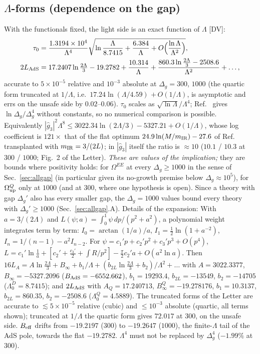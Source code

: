 \documentclass[aps,prl,onecolumn,superscriptaddress,nofootinbib]{revtex4-2}
\begin{document}
\subsection{\texorpdfstring{$\Lambda$}{Lambda}-forms (dependence on the gap)}
\label{sec:lambda}
With the functionals fixed, the light side is an exact function of $\Lambda$ [DV]:
\begin{align}
\tau_0&=\frac{1.3194\times10^4}{\Lambda^4}\sqrt{\ln\frac{\Lambda}{8.7415}+\frac{6.384}{\Lambda}+O\Big(\frac{\ln\Lambda}{\Lambda^2}\Big)},
\label{eq:cubicL}\\
2L_{\rm AdS}&=17.2407\ln\tfrac{2\Lambda}{3}-19.2782+\frac{10.314}{\Lambda}
+\frac{860.3\ln\frac{2\Lambda}{3}-2508.6}{\Lambda^2}+\dots,
\label{eq:quarticL}
\end{align}
accurate to $5\times10^{-5}$ relative and $10^{-3}$ absolute at $\Delta_g=300$, $1000$ (the quartic form truncated at
$1/\Lambda$, i.e.\ $17.24\ln(\Lambda/4.59)$ $+\,O(1/\Lambda)$, is asymptotic and errs on the unsafe side by $0.02$--$0.06$).
$\tau_0$ scales as $\sqrt{\ln\Lambda}/\Lambda^4$; Ref.~\cite{AKT} gives $\ln\Delta_g/\Delta_g^4$ without constants, so no
numerical comparison is possible. Equivalently $|\hat g_3|^2\Lambda^8\le3022.34\ln(2\Lambda/3)-5327.21+O(1/\Lambda)$, whose log
coefficient is $121\times$ that of the flat optimum $24.9\ln(M/m_{\rm IR})-27.6$ of Ref.~\cite{CHLPS} transplanted with
$m_{\rm IR}=3/(2L)$; in $|\hat g_3|$ itself the ratio is $\approx10$ ($10.1$ / $10.3$ at $300$ / $1000$; Fig.~2 of the Letter).
\emph{These are values of the implication;} they are bounds where positivity holds: for $\Omega^{EE}$ at every $\Delta_g\ge1000$ in
the sense of Sec.~\ref{sec:allgap} (in particular given its no-growth premise below $\Delta_g\approx10^5$), for $\Omega^Q_{\rm up}$ only
at $1000$ (and at $300$, where one hypothesis is open). Since a theory with gap $\Delta_g'$ also has every smaller gap, the
$\Delta_g=1000$ values bound every theory with $\Delta_g'\ge1000$ (Sec.~\ref{sec:allgap}.A).
Details of the expansion:
With $a=3/(2\Lambda)$ and $L(\psi;a)=\int_0^1\psi\,dp/(p^2+a^2)$, a polynomial weight integrates
term by term: $I_0=\arctan(1/a)/a$, $I_1=\tfrac12\ln(1+a^{-2})$, $I_n=1/(n-1)-a^2I_{n-2}$. For
$\psi=c_1'p+c_2'p^2+c_3'p^3+O(p^4)$,
$L=c_1'\ln\tfrac1a+[c_2'+\tfrac{c_3'}2+\int R/p^2]-\tfrac\pi2c_2'a+O(a^2\ln a)$. Then
$16L_A=A\ln\tfrac{2\Lambda}3+B_\infty+b_1/\Lambda+(b_{2L}\ln\tfrac{2\Lambda}3+b_2)/\Lambda^2+\dots$ with
$A=3022.3377$, $B_\infty=-5327.2096$ ($B_{\rm AdS}=-6552.662$), $b_1=19293.4$, $b_{2L}=-13549$,
$b_2=-14705$ ($\Lambda_0^D=8.7415$); and $2L_{\rm AdS}$ with $A_Q=17.240713$,
$B_\infty^Q=-19.278176$, $b_1=10.3137$, $b_{2L}=860.35$, $b_2=-2508.6$ ($\Lambda_0^Q=4.5889$). The
truncated forms of the Letter are accurate to $\lesssim5\times10^{-5}$ relative (cubic) and
$\le10^{-3}$ absolute (quartic, all terms shown); truncated at $1/\Lambda$ the quartic form gives
$72.017$ at $300$, on the unsafe side. $B_{\rm eff}$ drifts from $-19.2197$ ($300$) to $-19.2647$
($1000$), the finite-$\Lambda$ tail of the AdS pole, towards the flat $-19.2782$. $\Lambda^4$ must not
be replaced by $\Delta_g^4$ ($-1.99\%$ at $300$).
\end{document}
